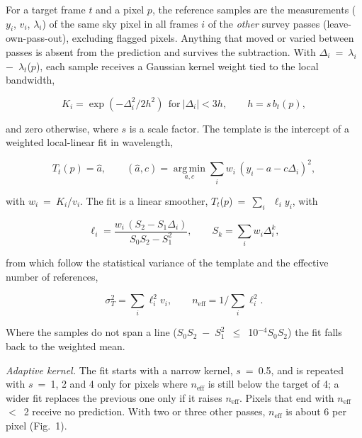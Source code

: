 \documentclass[conference]{IEEEtran}
\begin{document}
For a target frame $t$ and a pixel $p$, the reference samples are the measurements ($y_{i}$, $v_{i}$, $\lambda_{i}$) of the same sky pixel in all frames $i$ of the \emph{other} survey passes (leave-own-pass-out), excluding flagged pixels. Anything that moved or varied between passes is absent from the prediction and survives the subtraction. With $\Delta_{i}$~=~$\lambda_{i}$~$-$~$\lambda_{t}$($p$), each sample receives a Gaussian kernel weight tied to the local bandwidth,

\begin{equation}
K_i=\exp\!\left(-\Delta_i^2/2h^2\right)\ \ \text{for}\ |\Delta_i|<3h,\qquad h=s\,b_t(p),
\end{equation}

\noindent and zero otherwise, where $s$ is a scale factor. The template is the intercept of a weighted local-linear fit in wavelength,

\begin{equation}
T_t(p)=\hat a,\qquad(\hat a,\hat c)=\operatorname*{arg\,min}_{a,c}\sum_i w_i\,(y_i-a-c\Delta_i)^2,
\end{equation}

\noindent with $w_{i}$~=~$K_{i}$/$v_{i}$. The fit is a linear smoother, $T_{t}$($p$)~=~$\sum_{i}$~$\ell_{i}y_{i}$, with

\begin{equation}
\ell_i=\frac{w_i\,(S_2-S_1\Delta_i)}{S_0S_2-S_1^2},\qquad S_k=\sum_i w_i\Delta_i^k,
\end{equation}

\noindent from which follow the statistical variance of the template and the effective number of references,

\begin{equation}
\sigma_T^2=\sum_i \ell_i^2 v_i,\qquad n_{\mathrm{eff}}=1\Big/\sum_i \ell_i^2 .
\end{equation}

\noindent Where the samples do not span a line ($S_{0}S_{2}$~$-$~$S_{1}^{2}$~$\le$~10$^{-4}S_{0}S_{2}$) the fit falls back to the weighted mean.

\emph{Adaptive kernel.} The fit starts with a narrow kernel, $s$~=~0.5, and is repeated with $s$~=~1, 2 and 4 only for pixels where $n_{\mathrm{eff}}$ is still below the target of 4; a wider fit replaces the previous one only if it raises $n_{\mathrm{eff}}$. Pixels that end with $n_{\mathrm{eff}}$~$<$~2 receive no prediction. With two or three other passes, $n_{\mathrm{eff}}$ is about 6 per pixel (Fig.~1).
\end{document}
